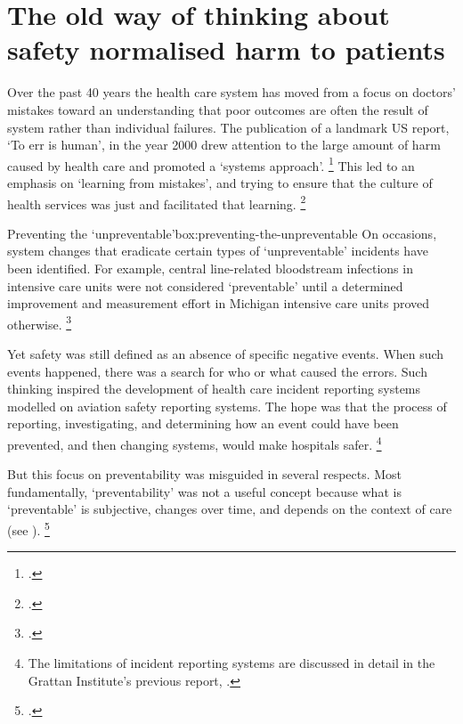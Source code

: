 \documentclass[FrontPage]{grattan}
\begin{document}
\section{The old way of thinking about safety normalised harm to patients}\label{sec:the-old-way-of-thinking-about-safety-normalised-harm-to-patients}

Over the past 40 years the health care system has moved from a focus on doctors' mistakes toward an understanding that poor outcomes are often the result of system rather than individual failures.
The publication of a landmark US report, `To err is human', in the year 2000 drew attention to the large amount of harm caused by health care and promoted a `systems approach'.%
	\footcite{NAP-2000-Err-is-human}
This led to an emphasis on `learning from mistakes', and trying to ensure that the culture of health services was just and facilitated that learning.%
	\footcites{Marx-2001-Patient-safety-primer-for-Health-execs}{Waring_2015}


\begin{verysmallbox}{Preventing the `unpreventable'}{box:preventing-the-unpreventable}
On occasions, system changes that eradicate certain types of `unpreventable' incidents have been identified.
For example, central line-related bloodstream infections in intensive care units were not considered `preventable' until a determined improvement and measurement effort in Michigan intensive care units proved otherwise.%
	\footcites{pronovost2010sustaining}{dixonwoods2012challenges}
\end{verysmallbox}

Yet safety was still defined as an absence of specific negative events.
When such events happened, there was a search for who or what caused the errors.
Such thinking inspired the development of health care incident reporting systems modelled on aviation safety reporting systems.
The hope was that the process of reporting, investigating, and determining how an event could have been prevented, and then changing systems, would make hospitals safer.%
	\footnote{The limitations of incident reporting systems are discussed in detail in the Grattan Institute's previous report, .}

But this focus on preventability was misguided in several respects.
Most fundamentally, `preventability' was not a useful concept because what is `preventable' is subjective, changes over time, and depends on the context of care (see ).%
	\footcite{Vincent-2016-Safer-Healthcare}
\end{document}
